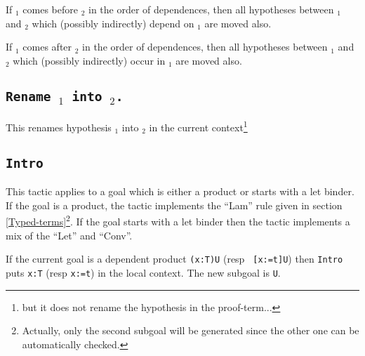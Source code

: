If {\ident$_1$} comes before {\ident$_2$} in the order of dependences,
then all hypotheses between {\ident$_1$} and {\ident$_2$} which
(possibly indirectly) depend on {\ident$_1$} are moved also.

If {\ident$_1$} comes after {\ident$_2$} in the order of dependences,
then all hypotheses between {\ident$_1$} and {\ident$_2$} which 
(possibly indirectly) occur in {\ident$_1$} are moved also.

\begin{ErrMsgs}
\item {}

\item {}
\item {}
\end{ErrMsgs}

\subsection{\tt Rename {\ident$_1$} into {\ident$_2$}.}
This renames hypothesis {\ident$_1$} into {\ident$_2$} in the current
context\footnote{but it does not rename the hypothesis in the
proof-term...}

\begin{ErrMsgs}
\item {}

\item {}
\end{ErrMsgs}

\subsection{\tt Intro}
\label{Intro}
This tactic applies to a goal which is either a product or starts with
a let binder. If the goal is a product, the tactic implements the
``Lam'' rule given in section
\ref{Typed-terms}\footnote{Actually, only the second subgoal will be
generated since the other one can be automatically checked.}.  If the
goal starts with a let binder then the tactic implements a mix of the
``Let'' and ``Conv''.

If the current goal is a dependent product {\tt (x:T)U} (resp {\tt
[x:=t]U}) then {\tt Intro} puts {\tt x:T} (resp {\tt x:=t}) in the
local context.
The new subgoal is {\tt U}.

